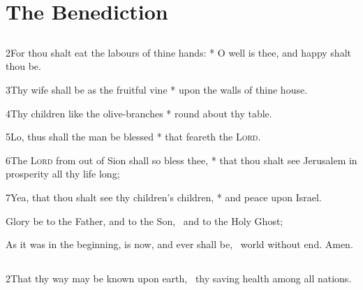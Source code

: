 \centerline{}

\section{The Benediction}
\subsection[{Psalm 128}]{}

2\enspace For thou shalt eat the labours of thine hands: * O well is thee, and happy shalt thou be.

3\enspace Thy wife shall be as the fruitful vine * upon the walls of thine house.

4\enspace Thy children like the olive-branches * round about thy table.

5\enspace Lo, thus shall the man be blessed * that feareth the {\scshape Lord}.

6\enspace The {\scshape Lord} from out of Sion shall so bless thee, * that thou shalt see Jerusalem in prosperity all thy life long;

7\enspace Yea, that thou shalt see thy children’s children, * and peace upon Israel.

Glory be to the Father, and to the Son, \star\  and to the Holy Ghost;

As it was in the beginning, is now, and ever shall be, \star\  world without end. Amen.

\medskip
\centerline{}
\subsection[{Psalm 67}]{}

2\enspace That thy way may be known upon earth, \star\ thy saving health among all nations.

